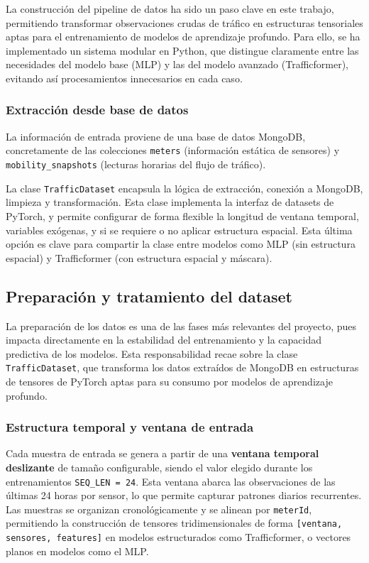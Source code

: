 La construcción del pipeline de datos ha sido un paso clave en este trabajo, permitiendo transformar observaciones crudas de tráfico en estructuras tensoriales aptas para el entrenamiento de modelos de aprendizaje profundo. Para ello, se ha implementado un sistema modular en Python, que distingue claramente entre las necesidades del modelo base (MLP) y las del modelo avanzado (Trafficformer), evitando así procesamientos innecesarios en cada caso.

\subsubsection*{Extracción desde base de datos}

La información de entrada proviene de una base de datos MongoDB, concretamente de las colecciones \texttt{meters} (información estática de sensores) y \texttt{mobility\_snapshots} (lecturas horarias del flujo de tráfico).

La clase \texttt{TrafficDataset} encapsula la lógica de extracción, conexión a MongoDB, limpieza y transformación. Esta clase implementa la interfaz de datasets de PyTorch, y permite configurar de forma flexible la longitud de ventana temporal, variables exógenas, y si se requiere o no aplicar estructura espacial. Esta última opción es clave para compartir la clase entre modelos como MLP (sin estructura espacial) y Trafficformer (con estructura espacial y máscara).

\subsection{Preparación y tratamiento del dataset}

La preparación de los datos es una de las fases más relevantes del proyecto, pues impacta directamente en la estabilidad del entrenamiento y la capacidad predictiva de los modelos. Esta responsabilidad recae sobre la clase \texttt{TrafficDataset}, que transforma los datos extraídos de MongoDB en estructuras de tensores de PyTorch aptas para su consumo por modelos de aprendizaje profundo.

\subsubsection*{Estructura temporal y ventana de entrada}

Cada muestra de entrada se genera a partir de una \textbf{ventana temporal deslizante} de tamaño configurable, siendo el valor elegido durante los entrenamientos \texttt{SEQ\_LEN = 24}. Esta ventana abarca las observaciones de las últimas 24 horas por sensor, lo que permite capturar patrones diarios recurrentes. Las muestras se organizan cronológicamente y se alinean por \texttt{meterId}, permitiendo la construcción de tensores tridimensionales de forma \texttt{[ventana, sensores, features]} en modelos estructurados como Trafficformer, o vectores planos en modelos como el MLP.

